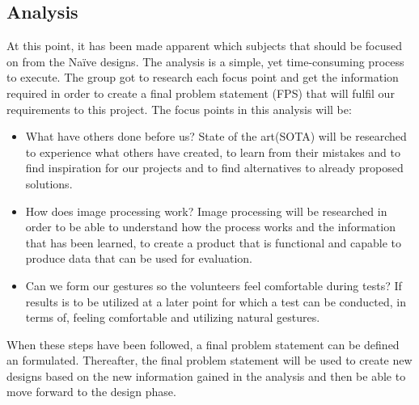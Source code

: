 \subsection{Analysis}
At this point, it has been made apparent which subjects that should be focused on from the Naïve designs. The analysis is a simple, yet time-consuming process to execute. The group got to research each focus point and get the information required in order to create a final problem statement (FPS) that will fulfil our requirements to this project. The focus points in this analysis will be:
\begin{itemize}
\item What have others done before us? \newline
State of the art(SOTA) will be researched to experience what others 	have created, to learn from their mistakes and to find inspiration for our projects and to find alternatives to already proposed solutions. 

\item How does image processing work? \newline
Image processing will be researched in order to be able to understand how the process works and the information that has been learned, to create a product that is functional and capable to produce data that can be used for evaluation.

\item Can we form our gestures so the volunteers feel comfortable during tests? \newline
If results is to be utilized at a later point for which a test can be conducted, in terms of, feeling comfortable and utilizing natural gestures.

\end{itemize} 
\pagebreak[1]
When these steps have been followed, a final problem statement can be defined an formulated. Thereafter, the final problem statement will be used to create new designs based on the new information gained in the analysis and then be able to move forward to the design phase.
